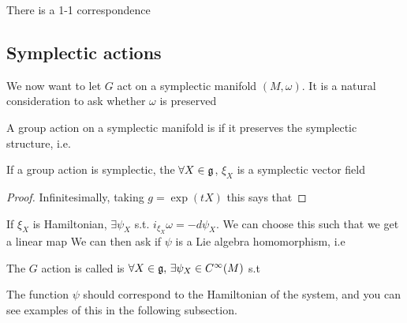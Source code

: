 \documentclass{article}
\begin{document}
\begin{theorem}
There is a 1-1 correspondence
\end{theorem}

\subsection{Symplectic actions}

We now want to let $G$ act on a symplectic manifold $(M,\omega)$. It is a natural consideration to ask whether $\omega$ is preserved

\begin{definition}
A group action on a symplectic manifold is  if it preserves the symplectic structure, i.e.
\end{definition}
\begin{prop}
If a group action is symplectic, the $\forall X \in \mathfrak{g}$, $\xi_X$ is a symplectic vector field
\end{prop}
\begin{proof}
Infinitesimally, taking $g = \exp(tX)$ this says that 
\end{proof}
If $\xi_X$ is Hamiltonian, $\exists \psi_X$ s.t. $i_{\xi_X} \omega = -d\psi_X$. We can choose this such that we get a linear map 
We can then ask if $\psi$ is a Lie algebra homomorphism, i.e 

\begin{definition}
The $G$ action is called  is $\forall X \in \mathfrak{g}, \, \exists \psi_X \in C^\infty(M)$ s.t 
\end{definition}

\begin{remark}
The function $\psi$ should correspond to the Hamiltonian of the system, and you can see examples of this in the following subsection. 
\end{remark}
\end{document}
